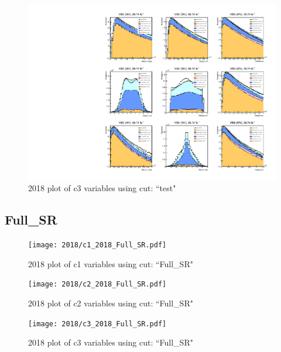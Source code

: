 \documentclass{article}
\begin{document}
                        \begin{figure}[H]
                            \centering
                            \caption{2018 plot of c3 variables using cut: ``test"}
                            \includegraphics[width=\textwidth]{2018/c3_2018_test.pdf}
                        \end{figure}    
      \subsection*{Full\_SR}
                        \begin{figure}[H]
                            \centering
                            \caption{2018 plot of c1 variables using cut: ``Full\_SR"}
                            \texttt{[image: 2018/c1\_2018\_Full\_SR.pdf]}
                        \end{figure}    
                        \begin{figure}[H]
                            \centering
                            \caption{2018 plot of c2 variables using cut: ``Full\_SR"}
                            \texttt{[image: 2018/c2\_2018\_Full\_SR.pdf]}
                        \end{figure}    
                        \begin{figure}[H]
                            \centering
                            \caption{2018 plot of c3 variables using cut: ``Full\_SR"}
                            \texttt{[image: 2018/c3\_2018\_Full\_SR.pdf]}
                        \end{figure}    
\end{document}
